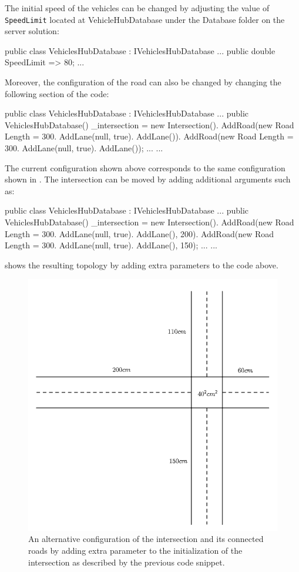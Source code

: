 	The initial speed of the vehicles can be changed by adjusting the value of \verb|SpeedLimit| located at VehicleHubDatabase under the Database folder on the server solution:
\begin{csharp}
public class VehiclesHubDatabase : IVehiclesHubDatabase
{
	...
	public double SpeedLimit => 80;
	...
}
\end{csharp}
Moreover, the configuration of the road can also be changed by changing the following section of the code:
\begin{csharp}
public class VehiclesHubDatabase : IVehiclesHubDatabase
{
	...
	public VehiclesHubDatabase()
	{
		_intersection = new Intersection().
			AddRoad(new Road {Length = 300}.
				AddLane(null, true).
				AddLane()).
			AddRoad(new Road {Length = 300}.
				AddLane(null, true).
				AddLane());
		...
	}
	...
}
\end{csharp}
The current configuration shown above corresponds to the same configuration shown in . The intersection can be moved by adding additional arguments such as:
\begin{csharp}
	public class VehiclesHubDatabase : IVehiclesHubDatabase
	{
		...
		public VehiclesHubDatabase()
		{
			_intersection = new Intersection().
				AddRoad(new Road {Length = 300}.
					AddLane(null, true).
					AddLane(), 200).
				AddRoad(new Road {Length = 300}.
					AddLane(null, true).
					AddLane(), 150);
			...
		}
		...
	}
\end{csharp}
 shows the resulting topology by adding extra parameters to the code above.
\begin{figure}[h!]
	\centering
	\includegraphics[width=1\linewidth]{figures/alt_intersection_config}
	\caption{An alternative configuration of the intersection and its connected roads by adding extra parameter to the initialization of the intersection as described by the previous code snippet.}
	\label{fig:altintersectionconfig}
\end{figure}

